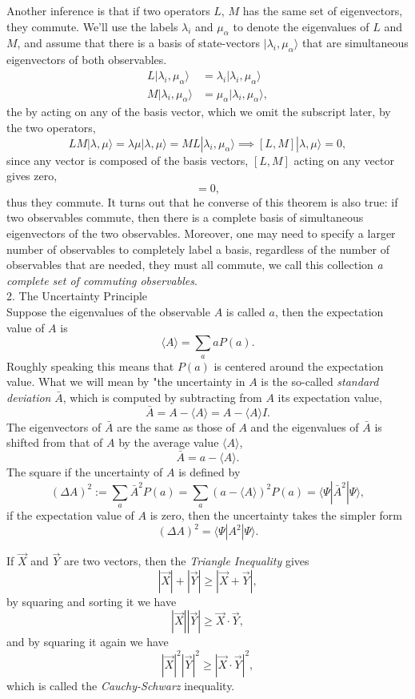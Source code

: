 \documentclass{article}
\newcommand{\be}{\begin{equation}}
\newcommand{\ee}{\end{equation}}
\newcommand{\bs}{\be\begin{split}}
\renewcommand{\1}{\left}
\renewcommand{\2}{\right}
\newcommand{\la}{\langle}
\newcommand{\ra}{\rangle}
\newcommand{\m}{\mu}
\newcommand{\al}{\alpha}
\newcommand{\lam}{\lambda}
\newcommand{\Del}{\Delta}
\begin{document}
Another inference is that if two operators $L$, $M$ has the same set of eigenvectors, they commute. We'll use the labels $\lam_i$ and $\m_\al$ to denote the eigenvalues of $L$ and $M$, and assume that there is a basis of state-vectors $|\lam_i,\m_\al\ra$ that are simultaneous eigenvectors of both observables.
\bs
L|\lam_i,\m_\al\ra&=\lam_i|\lam_i,\m_\al\ra\\
M|\lam_i,\m_\al\ra&=\m_\al|\lam_i,\m_\al\ra,
\end{split}\ee
the by acting on any of the basis vector, which we omit the subscript later, by the two operators,
\be
LM|\lam,\m\ra=\lam\m|\lam,\m\ra=ML|\lam_i,\m_\al\ra \implies [L,M]|\lam,\m\ra=0,
\ee
since any vector is composed of the basis vectors, $[L,M]$ acting on any vector gives zero,
\be [L,M]=0,\ee
thus they commute. It turns out that he converse of this theorem is also true: if two observables commute, then there is a complete basis of simultaneous eigenvectors of the two observables. Moreover, one may need to specify a larger number of observables to completely label a basis, regardless of the number of observables that are needed, they must all commute, we call this collection \textit{a complete set of commuting observables}.\\

2. The Uncertainty Principle\\

Suppose the eigenvalues of the observable $A$ is called $a$, then the expectation value of $A$ is
\be
\la A\ra= \sum_a aP(a).
\ee
Roughly speaking this means that $P(a)$ is centered around the expectation value. What we will mean by "the uncertainty in $A$ is the so-called \textit{standard deviation} $\bar A$, which is computed by subtracting from $A$ its expectation value,
\be
\bar A=A-\la A\ra=A-\la A\ra I.
\ee
The eigenvectors of $\bar A$ are the same as those of $A$ and the eigenvalues of $\bar A$ is shifted from that of $A$ by the average value $\la A\ra$,
\be
\bar A=a-\la A\ra.  
\ee
The square if the uncertainty of $A$ is defined by
\be
(\Del A)^2:=\sum_a \bar A^2 P(a)=\sum_a (a-\la A\ra)^2 P(a)=\la \Psi| \bar A^2|\Psi\ra,
\ee
if the expectation value of $A$ is zero, then the uncertainty takes the simpler form
\be
(\Del A)^2=\la \Psi| A^2|\Psi\ra.
\ee

If $\vec X$ and $\vec Y$ are two vectors, then the \textit{Triangle Inequality} gives
\be
|\vec X|+|\vec Y|\geqslant |\vec X+\vec Y|,
\ee
by squaring and sorting it we have
\be
|\vec X||\vec Y|\geqslant \vec X\cdot\vec Y,
\ee
and by squaring it again we have
\be
|\vec X|^2|\vec Y|^2\geqslant |\vec X\cdot\vec Y|^2,
\ee
which is called the \textit{Cauchy-Schwarz} inequality.
\end{document}
